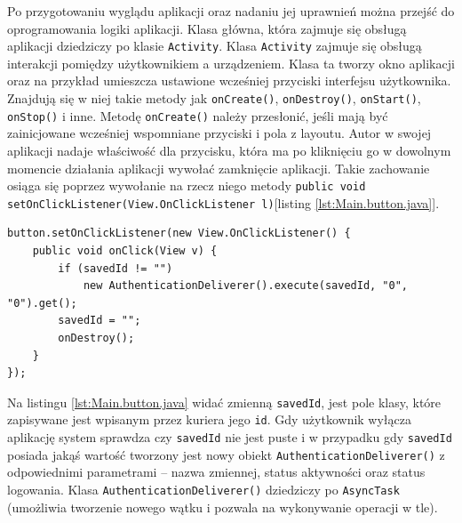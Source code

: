 \documentclass[eng,printmode,oneside]{mgr}
\begin{document}
Po przygotowaniu wyglądu aplikacji oraz nadaniu jej uprawnień można przejść
do oprogramowania logiki aplikacji. Klasa główna, która zajmuje się obsługą
aplikacji dziedziczy po klasie \texttt{Activity}. Klasa \texttt{Activity} zajmuje
się obsługą interakcji pomiędzy użytkownikiem a urządzeniem. Klasa ta tworzy okno aplikacji
oraz na przykład umieszcza ustawione wcześniej przyciski interfejsu użytkownika.
Znajdują się w niej takie metody jak \texttt{onCreate()}, \texttt{onDestroy()},
\texttt{onStart()}, \texttt{onStop()} i inne. Metodę \texttt{onCreate()} należy
przesłonić, jeśli mają być zainicjowane wcześniej wspomniane przyciski i pola z layoutu. Autor w swojej aplikacji nadaje
właściwość dla przycisku, która ma po kliknięciu go w dowolnym momencie
działania aplikacji wywołać zamknięcie aplikacji. Takie zachowanie osiąga się
poprzez wywołanie na rzecz niego metody \texttt{public void
setOnClickListener(View.OnClickListener l)}[listing \ref{lst:Main.button.java}].

\begin{lstlisting}[caption=Ustawienie właściwości przycisku
``Off'' w głównej klasie aplikacji mobilnej w
metodzie onCreate(),label=lst:Main.button.java] 
button.setOnClickListener(new View.OnClickListener() { 
	public void onClick(View v) { 
		if (savedId != "")
			new AuthenticationDeliverer().execute(savedId, "0", "0").get();
		savedId = "";
		onDestroy();
	}
});
\end{lstlisting}

Na listingu \ref{lst:Main.button.java} widać zmienną \texttt{savedId},
jest pole klasy, które zapisywane jest wpisanym przez kuriera jego \texttt{id}. Gdy użytkownik wyłącza
aplikację system sprawdza czy \texttt{savedId} nie jest puste i w przypadku gdy
\texttt{savedId} posiada jakąś wartość tworzony jest nowy obiekt
\texttt{AuthenticationDeliverer()} z odpowiednimi parametrami -- nazwa
zmiennej, status aktywności oraz status logowania. Klasa
\texttt{AuthenticationDeliverer()} dziedziczy po \texttt{AsyncTask} (umożliwia
tworzenie nowego wątku i pozwala na wykonywanie operacji w tle). 
\end{document}
